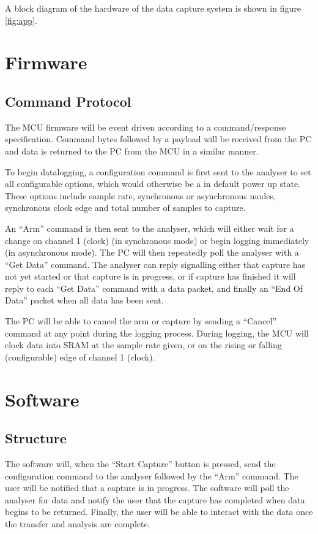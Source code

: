 \documentclass[11pt]{article}
\begin{document}
    A block diagram of the hardware of the data capture system is shown in figure \ref{fig:app}.
    
\section{Firmware}
\subsection{Command Protocol}
    The MCU firmware will be event driven according to a command/response
    specification. Command bytes followed by a payload will be received from the
    PC and data is returned to the PC from the MCU in a similar manner.
    
    To begin datalogging, a configuration command is first sent to the analyser
    to set all configurable options, which would otherwise be a in default power
    up state. These options include sample rate, synchronous or asynchronous
    modes, synchronous clock edge and total number of samples to capture.

    An ``Arm'' command is then sent to the analyser, which will either wait
    for a change on channel 1 (clock) (in synchronous mode) or begin logging
    immediately (in asynchronous mode). The PC will then repeatedly poll the
    analyser with a ``Get Data'' command.  The analyser can reply signalling either
    that capture has not yet started or that capture is in progress, or if capture
    has finished it will reply to each ``Get Data'' command with a data packet, and
    finally an ``End Of Data'' packet when all data has been sent.
    
    The PC will be able to cancel the arm or capture by sending a ``Cancel''
    command at any point during the logging process. During
    logging, the MCU will clock data into SRAM at the sample rate given, or on
    the rising or falling (configurable) edge of channel 1 (clock).


\section{Software}
\subsection{Structure}

The software will, when the ``Start Capture'' button is pressed, send the
    configuration command to the analyser followed by the ``Arm'' command.  The
    user will be notified that a capture is in progress.  The software will poll
    the analyser for data and notify the user that the capture has completed when
    data begins to be returned.  Finally, the user will be able to interact with
    the data once the transfer and analysis are complete.
\end{document}
